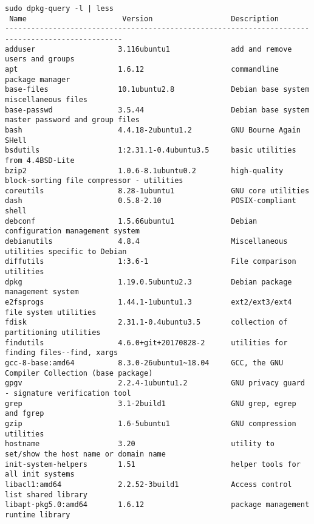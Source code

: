\begin{tcolorbox}[breakable,colback=yellow!5!black]
\begingroup \fontsize{6pt}{6pt}
\selectfont
\begin{verbatim} 
sudo dpkg-query -l | less
 Name                      Version                  Description
-------------------------------------------------------------------------------------------------
adduser                   3.116ubuntu1              add and remove users and groups
apt                       1.6.12                    commandline package manager
base-files                10.1ubuntu2.8             Debian base system miscellaneous files
base-passwd               3.5.44                    Debian base system master password and group files
bash                      4.4.18-2ubuntu1.2         GNU Bourne Again SHell
bsdutils                  1:2.31.1-0.4ubuntu3.5     basic utilities from 4.4BSD-Lite
bzip2                     1.0.6-8.1ubuntu0.2        high-quality block-sorting file compressor - utilities
coreutils                 8.28-1ubuntu1             GNU core utilities
dash                      0.5.8-2.10                POSIX-compliant shell
debconf                   1.5.66ubuntu1             Debian configuration management system
debianutils               4.8.4                     Miscellaneous utilities specific to Debian
diffutils                 1:3.6-1                   File comparison utilities
dpkg                      1.19.0.5ubuntu2.3         Debian package management system
e2fsprogs                 1.44.1-1ubuntu1.3         ext2/ext3/ext4 file system utilities
fdisk                     2.31.1-0.4ubuntu3.5       collection of partitioning utilities
findutils                 4.6.0+git+20170828-2      utilities for finding files--find, xargs
gcc-8-base:amd64          8.3.0-26ubuntu1~18.04     GCC, the GNU Compiler Collection (base package)
gpgv                      2.2.4-1ubuntu1.2          GNU privacy guard - signature verification tool
grep                      3.1-2build1               GNU grep, egrep and fgrep
gzip                      1.6-5ubuntu1              GNU compression utilities
hostname                  3.20                      utility to set/show the host name or domain name
init-system-helpers       1.51                      helper tools for all init systems
libacl1:amd64             2.2.52-3build1            Access control list shared library
libapt-pkg5.0:amd64       1.6.12                    package management runtime library

\end{verbatim}
\end{tcolorbox}
